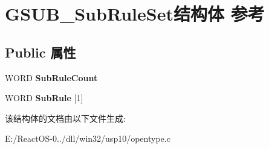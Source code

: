 \hypertarget{struct_g_s_u_b___sub_rule_set}{}\section{G\+S\+U\+B\+\_\+\+Sub\+Rule\+Set结构体 参考}
\label{struct_g_s_u_b___sub_rule_set}
\subsection*{Public 属性}
\begin{DoxyCompactItemize}
\item 
\mbox{\label{struct_g_s_u_b___sub_rule_set_aba3ffde94426dbbaadb448fa4006acb1}} 
W\+O\+RD {\bfseries Sub\+Rule\+Count}
\item 
\mbox{\label{struct_g_s_u_b___sub_rule_set_a04d766dcc12cf79dc4851fcee1c76a7f}} 
W\+O\+RD {\bfseries Sub\+Rule} \mbox{[}1\mbox{]}
\end{DoxyCompactItemize}


该结构体的文档由以下文件生成\+:\begin{DoxyCompactItemize}
\item 
E\+:/\+React\+O\+S-\/0../dll/win32/usp10/opentype.\+c\end{DoxyCompactItemize}

